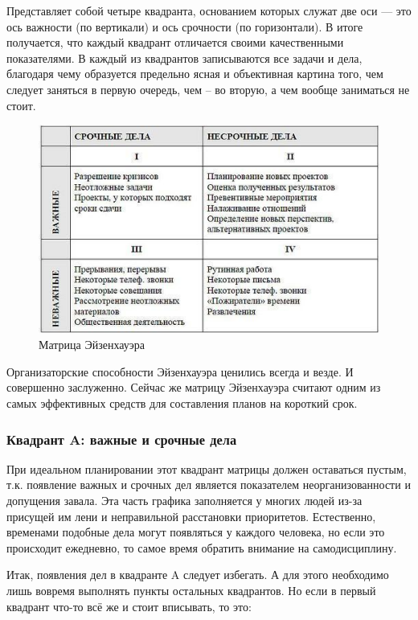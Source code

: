 Представляет собой четыре квадранта, основанием которых служат две оси — это ось важности (по вертикали) и ось срочности (по горизонтали). В итоге получается, что каждый квадрант отличается своими качественными показателями. В каждый из квадрантов записываются все задачи и дела, благодаря чему образуется предельно ясная и объективная картина того, чем следует заняться в первую очередь, чем – во вторую, а чем вообще заниматься не стоит.

\label{page:domain:piramida_franklina}
\begin{figure}
\centering
  \includegraphics[scale=0.85]{images/eizinhower.jpg}  
  \caption{ Матрица Эйзенхауэра }
  \label{fig:domain:eizenhower}
\end{figure}

Организаторские способности Эйзенхауэра ценились всегда и везде. И совершенно заслуженно. Сейчас же матрицу Эйзенхауэра считают одним из самых эффективных средств для составления планов на короткий срок.



\subsubsection{Квадрант A: важные и срочные дела }


При идеальном планировании этот квадрант матрицы должен оставаться пустым, т.к. появление важных и срочных дел является показателем неорганизованности и допущения завала. Эта часть графика заполняется у многих людей из-за присущей им лени и неправильной расстановки приоритетов. Естественно, временами подобные дела могут появляться у каждого человека, но если это происходит ежедневно, то самое время обратить внимание на самодисциплину.

Итак, появления дел в квадранте A следует избегать. А для этого необходимо лишь вовремя выполнять пункты остальных квадрантов. Но если в первый квадрант что-то всё же и стоит вписывать, то это:

